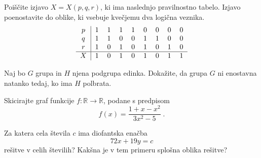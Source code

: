 \documentclass{izpit}
\begin{document}

\naloga[\tocke{25}]

  \podnaloga[15]
    Poiščite izjavo $X = X(p, q, r)$, ki ima naslednjo pravilnostno tabelo.
    Izjavo poenostavite do oblike, ki vsebuje kvečjemu dva logična veznika.
    \[
      \begin{tabular}{c|cccccccc}
        $p$ & 1 & 1 & 1 & 1 & 0 & 0 & 0 & 0 \\
        $q$ & 1 & 1 & 0 & 0 & 1 & 1 & 0 & 0 \\
        $r$ & 1 & 0 & 1 & 0 & 1 & 0 & 1 & 0 \\\hline
        $X$ & 1 & 0 & 1 & 0 & 1 & 0 & 1 & 1 \\
      \end{tabular}
    \]
  
  \prostor[2] %

  \podnaloga[10]
    Naj bo $G$ grupa in $H$ njena podgrupa edinka. Dokažite, da grupa $G$ ni
    enostavna natanko tedaj, ko ima $H$ polbrata.

  \prostor

\naloga[\tocke{25}]
  Skicirajte graf funkcije $f \colon \mathbb{R} \to \mathbb{R}$, podane s
  predpisom
  \[
    f(x) = \frac{1 + x - x^2}{3 x^2 - 5} \;.
  \]



  Za katera cela števila $c$ ima diofantska enačba
  \[
    72 x + 19 y = c
  \]
  rešitve v celih številih? Kakšna je v tem primeru splošna oblika rešitve?
\end{document}
